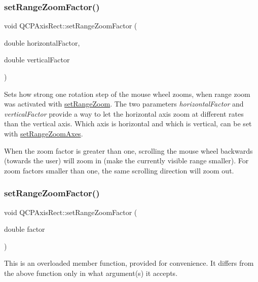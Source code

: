 \subsubsection{\texorpdfstring{set\+Range\+Zoom\+Factor()}{setRangeZoomFactor()}\hspace{0.1cm}{\footnotesize\ttfamily [1/2]}}
{\footnotesize\ttfamily void Q\+C\+P\+Axis\+Rect\+::set\+Range\+Zoom\+Factor (\begin{DoxyParamCaption}\item[{double}]{horizontal\+Factor,  }\item[{double}]{vertical\+Factor }\end{DoxyParamCaption})}

Sets how strong one rotation step of the mouse wheel zooms, when range zoom was activated with \hyperlink{class_q_c_p_axis_rect_a7960a9d222f1c31d558b064b60f86a31}{set\+Range\+Zoom}. The two parameters {\itshape horizontal\+Factor} and {\itshape vertical\+Factor} provide a way to let the horizontal axis zoom at different rates than the vertical axis. Which axis is horizontal and which is vertical, can be set with \hyperlink{class_q_c_p_axis_rect_a9442cca2aa358405f39a64d51eca13d2}{set\+Range\+Zoom\+Axes}.

When the zoom factor is greater than one, scrolling the mouse wheel backwards (towards the user) will zoom in (make the currently visible range smaller). For zoom factors smaller than one, the same scrolling direction will zoom out. \hypertarget{class_q_c_p_axis_rect_ae83d187b03fc6fa4f00765ad50cd3fc3}{}\label{class_q_c_p_axis_rect_ae83d187b03fc6fa4f00765ad50cd3fc3} 
\subsubsection{\texorpdfstring{set\+Range\+Zoom\+Factor()}{setRangeZoomFactor()}\hspace{0.1cm}{\footnotesize\ttfamily [2/2]}}
{\footnotesize\ttfamily void Q\+C\+P\+Axis\+Rect\+::set\+Range\+Zoom\+Factor (\begin{DoxyParamCaption}\item[{double}]{factor }\end{DoxyParamCaption})}

This is an overloaded member function, provided for convenience. It differs from the above function only in what argument(s) it accepts.

